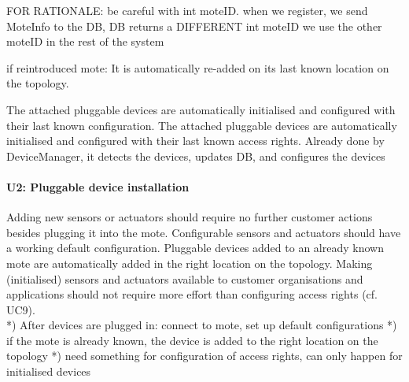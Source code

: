                 FOR RATIONALE: be careful with int moteID. when we register, we send MoteInfo to the DB, DB returns a DIFFERENT int moteID
                               we use the other moteID in the rest of the system

        if reintroduced mote:
            It is automatically re-added on its last known location on the topology.

            The attached pluggable devices are automatically initialised and configured with their last known configuration.
            The attached pluggable devices are automatically initialised and configured with their last known access rights.
                Already done by DeviceManager, it detects the devices, updates DB, and configures the devices


    \paragraph{U2: Pluggable device installation}
        Adding new sensors or actuators should require no further customer
        actions besides plugging it into the mote. Configurable sensors and
        actuators should have a working default configuration.
        Pluggable devices added to an already known mote are automatically
        added in the right location on the topology.
        Making (initialised) sensors and actuators available to customer
        organisations and applications should not require more effort than
        configuring access rights (cf. UC9). \\
        *) After devices are plugged in: connect to mote, set up default configurations
        *) if the mote is already known, the device is added to the right location on the topology
        *) need something for configuration of access rights, can only happen for initialised devices

